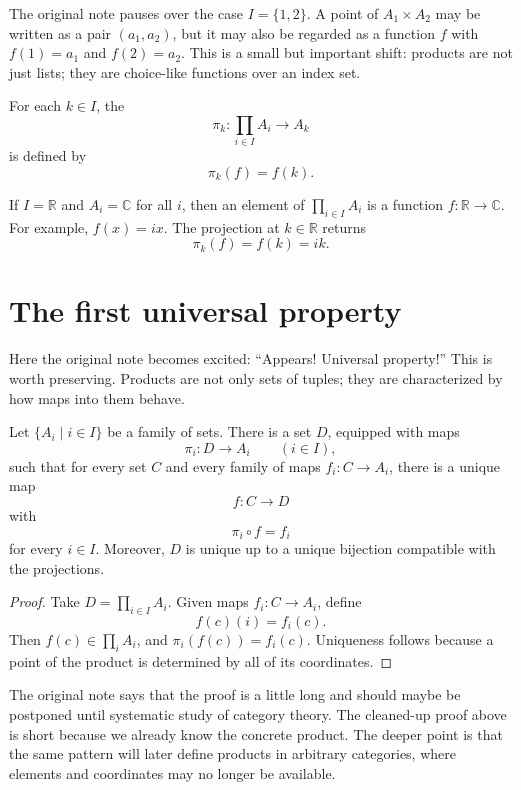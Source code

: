 \begin{remark}
The original note pauses over the case \(I=\{1,2\}\).  A point of \(A_1\times A_2\) may be written as a pair \((a_1,a_2)\), but it may also be regarded as a function \(f\) with \(f(1)=a_1\) and \(f(2)=a_2\).  This is a small but important shift: products are not just lists; they are choice-like functions over an index set.
\end{remark}

For each \(k\in I\), the 
\[
  \pi_k:\prod_{i\in I}A_i\to A_k
\]
is defined by
\[
  \pi_k(f)=f(k).
\]

\begin{example}
If \(I=\mathbb R\) and \(A_i=\mathbb C\) for all \(i\), then an element of \(\prod_{i\in I}A_i\) is a function \(f:\mathbb R\to\mathbb C\).  For example, \(f(x)=ix\).  The projection at \(k\in\mathbb R\) returns
\[
  \pi_k(f)=f(k)=ik.
\]
\end{example}

\section{The first universal property}

Here the original note becomes excited: ``Appears! Universal property!''  This is worth preserving.  Products are not only sets of tuples; they are characterized by how maps into them behave.

\begin{theorem}
Let \(\{A_i\mid i\in I\}\) be a family of sets.  There is a set \(D\), equipped with maps
\[
  \pi_i:D\to A_i \qquad (i\in I),
\]
such that for every set \(C\) and every family of maps \(f_i:C\to A_i\), there is a unique map
\[
  f:C\to D
\]
with
\[
  \pi_i\circ f=f_i
\]
for every \(i\in I\).  Moreover, \(D\) is unique up to a unique bijection compatible with the projections.
\end{theorem}

\begin{proof}
Take \(D=\prod_{i\in I}A_i\).  Given maps \(f_i:C\to A_i\), define
\[
  f(c)(i)=f_i(c).
\]
Then \(f(c)\in\prod_i A_i\), and \(\pi_i(f(c))=f_i(c)\).  Uniqueness follows because a point of the product is determined by all of its coordinates.
\end{proof}

\begin{remark}
The original note says that the proof is a little long and should maybe be postponed until systematic study of category theory.  The cleaned-up proof above is short because we already know the concrete product.  The deeper point is that the same pattern will later define products in arbitrary categories, where elements and coordinates may no longer be available.
\end{remark}

